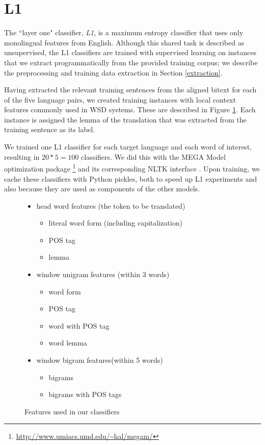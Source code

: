 \documentclass[11pt,letterpaper]{article}
\begin{document}
\section{L1}
The ``layer one" classifier, \emph{L1}, is a maximum entropy classifier that
uses only monolingual features from English. Although this shared task is
described as unsupervised, the L1 classifiers are trained with supervised
learning on instances that we extract programmatically from the provided
training corpus; we describe the preprocessing and training data extraction in
Section \ref{extraction}.

Having extracted the relevant training sentences from the aligned bitext for
each of the five language pairs, we created training instances with local
context features commonly used in WSD systems. These are described in Figure
\ref{fig:features}. Each instance is assigned the lemma of the translation that
was extracted from the training sentence as its label.

We trained one L1 classifier for each target language and each word of
interest, resulting in $20*5 = 100$ classifiers. We did this with the MEGA
Model optimization package \cite{daume04cg-bfgs}
\footnote{\url{http://www.umiacs.umd.edu/~hal/megam/}} and its corresponding
NLTK interface \cite{nltkbook}. Upon training, we cache these classifiers with
Python pickles, both to speed up L1 experiments and also because they are used
as components of the other models.

\begin{figure}
  \begin{itemize}  %
  
  \item head word features (the token to be translated)
  \begin{itemize}  %
       \item literal word form (including capitalization)
       \item POS tag
       \item lemma
  \end{itemize}
  \item window unigram features (within 3 words)
  \begin{itemize} %
  		\item word form
  		\item POS tag
  		\item word with POS tag
  		\item word lemma
  \end{itemize}
  \item window bigram features(within 5 words)
  \begin{itemize} %
  		\item bigrams 
  		\item bigrams with POS tags
  \end{itemize}  
  \end{itemize}   %
  \caption{Features used in our classifiers}
  \label{fig:features}
\end{figure}
\end{document}
